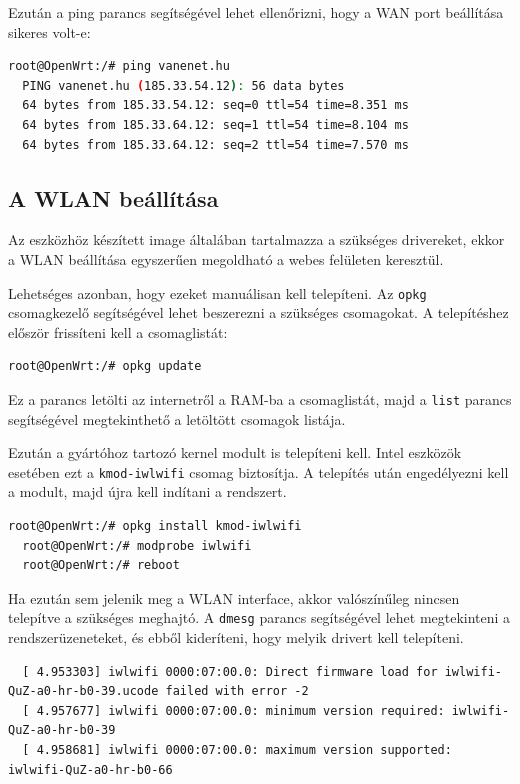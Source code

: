 \documentclass[12pt]{article}
\begin{document}
Ezután a ping parancs segítségével lehet ellenőrizni, hogy a WAN port beállítása sikeres volt-e:

\begin{lstlisting}[language=Bash]
  root@OpenWrt:/# ping vanenet.hu
  PING vanenet.hu (185.33.54.12): 56 data bytes
  64 bytes from 185.33.54.12: seq=0 ttl=54 time=8.351 ms
  64 bytes from 185.33.64.12: seq=1 ttl=54 time=8.104 ms
  64 bytes from 185.33.64.12: seq=2 ttl=54 time=7.570 ms
\end{lstlisting}


\subsection{A WLAN beállítása}

Az eszközhöz készített image általában tartalmazza a szükséges drivereket, ekkor a WLAN beállítása egyszerűen megoldható a webes felületen keresztül.

Lehetséges azonban, hogy ezeket manuálisan kell telepíteni. Az \texttt{opkg} csomagkezelő segítségével lehet beszerezni a szükséges csomagokat. A telepítéshez először frissíteni kell a csomaglistát:

\begin{lstlisting}[language=Bash]
  root@OpenWrt:/# opkg update
\end{lstlisting}

Ez a parancs letölti az internetről a RAM-ba a csomaglistát, majd a \texttt{list} parancs segítségével megtekinthető a letöltött csomagok listája.

Ezután a gyártóhoz tartozó kernel modult is telepíteni kell. Intel eszközök esetében ezt a \texttt{kmod-iwlwifi} csomag biztosítja. A telepítés után engedélyezni kell a modult, majd újra kell indítani a rendszert. \cite{iwlwifi}

\begin{lstlisting}[language=Bash]
  root@OpenWrt:/# opkg install kmod-iwlwifi
  root@OpenWrt:/# modprobe iwlwifi
  root@OpenWrt:/# reboot
\end{lstlisting}

Ha ezután sem jelenik meg a WLAN interface, akkor valószínűleg nincsen telepítve a szükséges meghajtó. A \texttt{dmesg} parancs segítségével lehet megtekinteni a rendszerüzeneteket, és ebből kideríteni, hogy melyik drivert kell telepíteni.

\begin{lstlisting}
  [ 4.953303] iwlwifi 0000:07:00.0: Direct firmware load for iwlwifi-QuZ-a0-hr-b0-39.ucode failed with error -2
  [ 4.957677] iwlwifi 0000:07:00.0: minimum version required: iwlwifi-QuZ-a0-hr-b0-39
  [ 4.958681] iwlwifi 0000:07:00.0: maximum version supported: iwlwifi-QuZ-a0-hr-b0-66
\end{lstlisting}
\end{document}
